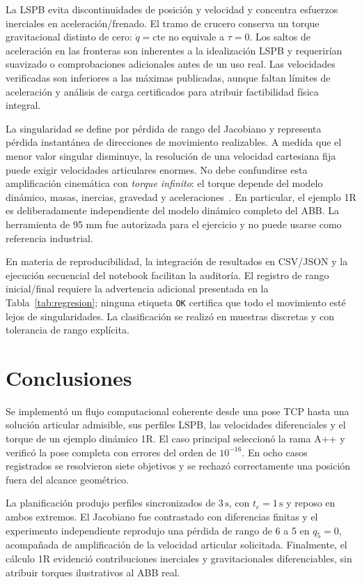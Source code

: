 \documentclass[conference,letterpaper]{IEEEtran}
\begin{document}
	La LSPB evita discontinuidades de posición y velocidad y concentra esfuerzos inerciales en aceleración/frenado. El tramo de crucero conserva un torque gravitacional distinto de cero: \(\dot q=\mathrm{cte}\) no equivale a \(\tau=0\). Los saltos de aceleración en las fronteras son inherentes a la idealización LSPB y requerirían suavizado o comprobaciones adicionales antes de un uso real. Las velocidades verificadas son inferiores a las máximas publicadas, aunque faltan límites de aceleración y análisis de carga certificados para atribuir factibilidad física integral.
	
	La singularidad se define por pérdida de rango del Jacobiano y representa pérdida instantánea de direcciones de movimiento realizables. A medida que el menor valor singular disminuye, la resolución de una velocidad cartesiana fija puede exigir velocidades articulares enormes. No debe confundirse esta amplificación cinemática con \emph{torque infinito}: el torque depende del modelo dinámico, masas, inercias, gravedad y aceleraciones~\cite{dinamica,rubrica}. En particular, el ejemplo 1R es deliberadamente independiente del modelo dinámico completo del ABB. La herramienta de 95 mm fue autorizada para el ejercicio y no puede usarse como referencia industrial.
	
	En materia de reproducibilidad, la integración de resultados en CSV/JSON y la ejecución secuencial del notebook facilitan la auditoría. El registro de rango inicial/final requiere la advertencia adicional presentada en la Tabla~\ref{tab:regresion}; ninguna etiqueta \texttt{OK} certifica que todo el movimiento esté lejos de singularidades. La clasificación se realizó en muestras discretas y con tolerancia de rango explícita.
	
	\section{Conclusiones}
	Se implementó un flujo computacional coherente desde una pose TCP hasta una solución articular admisible, sus perfiles LSPB, las velocidades diferenciales y el torque de un ejemplo dinámico 1R. El caso principal seleccionó la rama A++ y verificó la pose completa con errores del orden de \(10^{-16}\). En ocho casos registrados se resolvieron siete objetivos y se rechazó correctamente una posición fuera del alcance geométrico.
	
	La planificación produjo perfiles sincronizados de \(3\,\mathrm{s}\), con \(t_c=1\,\mathrm{s}\) y reposo en ambos extremos. El Jacobiano fue contrastado con diferencias finitas y el experimento independiente reprodujo una pérdida de rango de 6 a 5 en \(q_5=0\), acompañada de amplificación de la velocidad articular solicitada. Finalmente, el cálculo 1R evidenció contribuciones inerciales y gravitacionales diferenciables, sin atribuir torques ilustrativos al ABB real.
	
\end{document}
